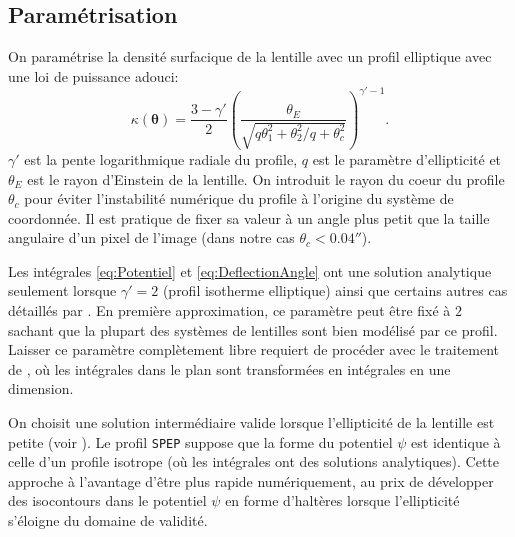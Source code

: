 \documentclass[times,10pt,twocolumn]{article}
\begin{document}
\subsection{Paramétrisation}
On paramétrise la densité surfacique de la lentille avec un profil elliptique avec une loi 
de puissance adouci:
\begin{equation}\label{eq:Kappa} 
        \kappa(\boldsymbol{\theta}) = \frac{3 - \gamma'}{2} 
        \left( 
        \frac{\theta_E}{\sqrt{q\theta_1^2 + \theta_2^2/q + \theta_c^2}}
\right)^{\gamma'- 1}. 
\end{equation} 
$\gamma'$ est la pente logarithmique radiale du profile, $q$ est le paramètre d'ellipticité
et $\theta_E$ est le rayon d'Einstein de la lentille. On introduit le rayon du coeur du profile 
$\theta_c$ pour éviter l'instabilité numérique du profile à l'origine du système de coordonnée. 
Il est pratique de fixer sa valeur à un angle plus petit que la taille angulaire d'un 
pixel de l'image (dans notre cas $\theta_c < 0.04''$). \par

Les intégrales \ref{eq:Potentiel} et \ref{eq:DeflectionAngle} ont une solution analytique 
seulement lorsque $\gamma'= 2$ (profil isotherme elliptique) ainsi que certains autres cas 
détaillés par \cite{Keeton2001}. En première approximation, ce paramètre peut être fixé 
à $2$ sachant que la plupart des systèmes de lentilles sont bien modélisé par ce profil. 
Laisser ce paramètre complètement libre requiert de procéder avec le traitement de 
\cite{Barkana1998}, où les intégrales dans le plan sont transformées en intégrales en une 
dimension. \par

On choisit une solution intermédiaire valide lorsque l'ellipticité de la lentille est 
petite (voir \cite{Barkana1998}). Le profil \texttt{SPEP} suppose que la forme 
du potentiel $\psi$ est identique à celle d'un profile isotrope (où 
les intégrales ont des solutions analytiques). Cette approche à l'avantage d'être plus 
rapide numériquement, au prix de développer des isocontours dans le potentiel $\psi$
en forme d'haltères lorsque 
l'ellipticité s'éloigne du domaine de validité.


\end{document}
